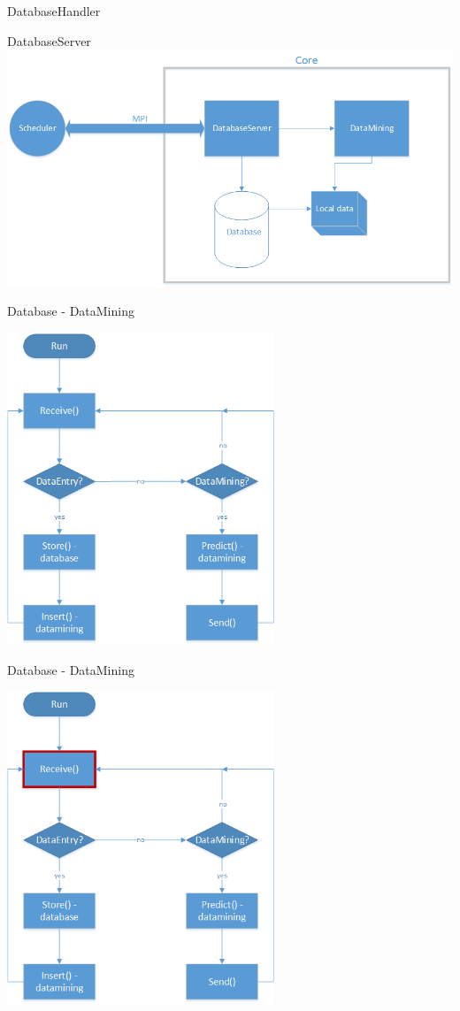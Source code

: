 \begin{frame}{DatabaseHandler}
	\end{frame}
	
	\begin{frame}{DatabaseServer}
	\includegraphics[width=1.0\textwidth]{images/Zeichnung6.png}
	\end{frame}
	
	\begin{frame}{Database - DataMining}
	\begin{center}
	\includegraphics[height=0.64\textwidth, width=0.6\textwidth]{images/datamining_flow.png}
	\end{center}
	\end{frame}
	
	\begin{frame}{Database - DataMining}
		\begin{center}
	\includegraphics[height=0.64\textwidth, width=0.6\textwidth]{images/datamining_flow0.png}
	\end{center}
	\end{frame}
	
